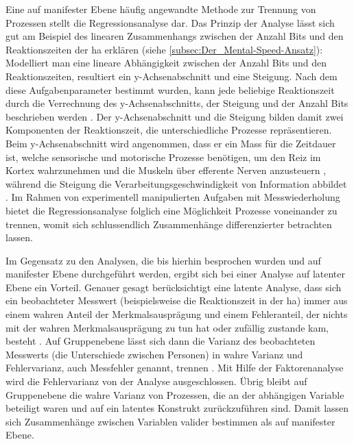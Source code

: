\documentclass[11pt, twoside, a4paper]{book}		%
\begin{document}
Eine auf manifester Ebene häufig angewandte Methode zur Trennung von Prozessen stellt die Regressionsanalyse dar. Das Prinzip der Analyse lässt sich gut am Beispiel des linearen Zusammenhangs zwischen der Anzahl Bits und den Reaktionszeiten der \gls{ha} erklären (siehe \autoref{subsec:Der_Mental-Speed-Ansatz}): Modelliert man eine lineare Abhängigkeit zwischen der Anzahl Bits und den Reaktionszeiten, resultiert ein y-Achsen\-ab\-schnitt und eine Steigung. Nach dem diese Aufgabenparameter bestimmt wurden, kann jede beliebige Reaktionszeit durch die Verrechnung des y-Achsen\-ab\-schnitts, der Steigung und der Anzahl Bits beschrieben werden \citep[S. 105]{Jensen1987a}. 
Der y-Achsen\-ab\-schnitt und die Steigung bilden damit zwei Komponenten der Reaktionszeit, die unterschiedliche Prozesse repräsentieren. Beim y-Achsen\-ab\-schnitt wird angenommen, dass er ein Mass für die Zeitdauer ist, welche sensorische und motorische Prozesse benötigen, um den Reiz im Kortex wahrzunehmen und die Muskeln über efferente Nerven anzusteuern \citep{Jensen1998b}, während die Steigung die Verarbeitungsgeschwindigkeit von Information abbildet \citep{Jensen1998b, Roth1964}.
Im Rahmen von experimentell manipulierten Aufgaben mit Messwiederholung bietet die Regressionsanalyse folglich eine Möglichkeit Prozesse voneinander zu trennen, womit sich schlussendlich Zusammenhänge differenzierter betrachten lassen.


Im Gegensatz zu den Analysen, die bis hierhin besprochen wurden und auf manifester Ebene durchgeführt werden, ergibt sich bei einer Analyse auf latenter Ebene ein Vorteil. 
Genauer gesagt berücksichtigt eine latente Analyse, dass sich ein beobachteter Messwert (beispielsweise die Reaktionszeit in der \gls{ha}) immer aus einem wahren Anteil der Merkmalsausprägung und einem Fehleranteil, der nichts mit der wahren Merkmalsausprägung zu tun hat oder zufällig zustande kam, besteht \citep[S. 9]{Kline2011}.
Auf Gruppenebene lässt sich dann die Varianz des beobachteten Messwerts (die Unterschiede zwischen Personen) in wahre Varianz und Fehlervarianz, auch Messfehler genannt, trennen \citep{Moosbrugger2007}.
Mit Hilfe der Faktorenanalyse wird die Fehlervarianz von der Analyse ausgeschlossen. Übrig bleibt auf Gruppenebene die wahre Varianz von Prozessen, die an der abhängigen Variable beteiligt waren und auf ein latentes Konstrukt zurückzuführen sind. Damit lassen sich Zusammenhänge zwischen Variablen valider bestimmen als auf manifester Ebene.
\end{document}
